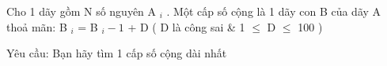 Cho 1 dãy gồm N số nguyên  A   $_    i   $   . Một cấp số cộng là 1 dãy con B của dãy A thoả mãn: B   $_    i   $   =  B   $_    i-1   $   + D ( D là công sai \& 1  $\le$  D  $\le$  100 )  

   Yêu cầu: Bạn hãy tìm 1 cấp số cộng dài nhất
